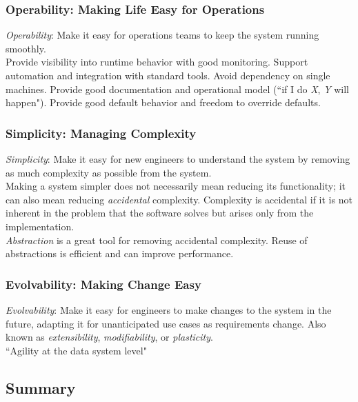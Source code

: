 \documentclass[12pt, titlepage]{article}
\begin{document}
\subsubsection{Operability: Making Life Easy for Operations}

\textit{Operability}: Make it easy for operations teams to keep the system running smoothly. \\

Provide visibility into runtime behavior with good monitoring. Support automation and integration with standard tools. Avoid dependency on single machines. Provide good documentation and operational model (``if I do \textit{X}, \textit{Y} will happen"). Provide good default behavior and freedom to override defaults.

\subsubsection{Simplicity: Managing Complexity}

\textit{Simplicity}: Make it easy for new engineers to understand the system by removing as much complexity as possible from the system. \\

Making a system simpler does not necessarily mean reducing its functionality; it can also mean reducing \textit{accidental} complexity. Complexity is accidental if it is not inherent in the problem that the software solves but arises only from the implementation. \\

\textit{Abstraction} is a great tool for removing accidental complexity. Reuse of abstractions is efficient and can improve performance.

\subsubsection{Evolvability: Making Change Easy}

\textit{Evolvability}: Make it easy for engineers to make changes to the system in the future, adapting it for unanticipated use cases as requirements change. Also known as \textit{extensibility}, \textit{modifiability}, or \textit{plasticity}. \\

``Agility at the data system level"

\subsection{Summary}
\end{document}
